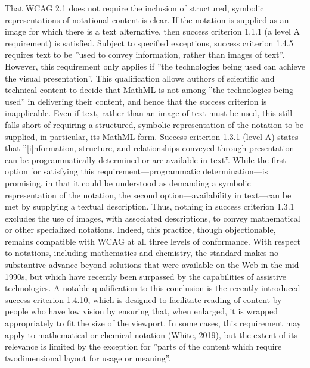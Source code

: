 \documentclass{sig-alternate} %
\begin{document}
\begin{large}
That WCAG 2.1 does not require the inclusion of structured, symbolic representations of notational content is clear. If the notation is supplied as an image for which there is a text alternative, then success criterion 1.1.1 (a level A requirement) is satisfied. Subject to specified exceptions, success criterion 1.4.5 requires text to be ”used to convey information, rather than images of text”. However, this requirement only applies if ”the technologies being used can achieve the visual presentation”. This qualification allows authors of scientific and technical content to decide that MathML is not among ”the technologies being used” in delivering their content, and hence that the success criterion is inapplicable. Even if text, rather than an image of text must be used, this still falls short of requiring a structured, symbolic representation of the notation to be supplied, in particular, its MathML form. Success criterion 1.3.1 (level A) states that ”[i]nformation, structure, and relationships conveyed through presentation can be programmatically determined or are available in text”. While the first option for satisfying this requirement—programmatic determination—is promising, in that it could be understood as demanding a symbolic representation of the notation, the second option—availability in text—can be met by supplying a textual description. Thus, nothing in success criterion 1.3.1 excludes the use of images, with associated descriptions, to convey mathematical or other specialized notations. Indeed, this practice, though objectionable, remains compatible with WCAG at all three levels of conformance. With respect to notations, including mathematics and chemistry, the standard makes no substantive advance beyond solutions that were available on the Web in the mid 1990s, but which have recently been surpassed by the capabilities of assistive technologies. A notable qualification to this conclusion is the recently introduced success criterion 1.4.10, which is designed to facilitate reading of content by people who have low vision by ensuring that, when enlarged, it is wrapped appropriately to fit the size of the viewport. In some cases, this requirement may apply to mathematical or chemical notation (White, 2019), but the extent of its relevance is limited by the exception for ”parts of the content which require twodimensional layout for usage or meaning”.



\end{large}
\end{document}
